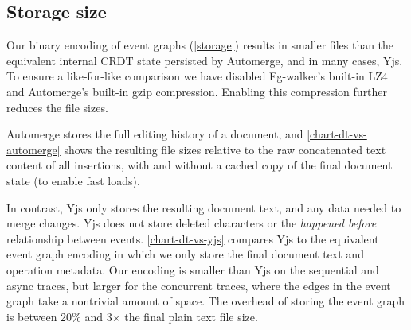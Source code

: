 \documentclass[sigplan,10pt]{acmart}
\newcommand{\algname}{Eg-walker\xspace}
\begin{document}


\subsection{Storage size}

Our binary encoding of event graphs (\autoref{storage}) results in smaller files than the equivalent internal CRDT state persisted by Automerge, and in many cases, Yjs.
To ensure a like-for-like comparison we have disabled \algname's built-in LZ4 and Automerge's built-in gzip compression. Enabling this compression further reduces the file sizes.


Automerge stores the full editing history of a document, and \autoref{chart-dt-vs-automerge} shows the resulting file sizes relative to the raw concatenated text content of all insertions, with and without a cached copy of the final document state (to enable fast loads).


In contrast, Yjs only stores the resulting document text, and any data needed to merge changes.
Yjs does not store deleted characters or the \emph{happened before} relationship between events.
\autoref{chart-dt-vs-yjs} compares Yjs to the equivalent event graph encoding in which we only store the final document text and operation metadata.
Our encoding is smaller than Yjs on the sequential and async traces, but larger for the concurrent traces, where the edges in the event graph take a nontrivial amount of space.
The overhead of storing the event graph is between 20\% and 3$\times$ the final plain text file size.
\end{document}
